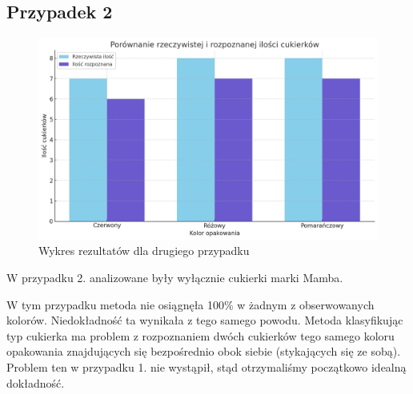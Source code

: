 \documentclass{article}
\begin{document}
\subsection{Przypadek 2}

\begin{figure}[H]
    \centering
    \includegraphics[width=\linewidth]{wykres2.png}
    \caption{Wykres rezultatów dla drugiego przypadku}
    \label{fig:przypadek2}
\end{figure}


W przypadku 2. analizowane były wyłącznie cukierki marki Mamba.


W tym przypadku metoda nie osiągnęła 100\% w żadnym z obserwowanych kolorów. Niedokładność ta wynikała z tego samego powodu. Metoda klasyfikując typ cukierka ma problem z rozpoznaniem dwóch cukierków tego samego koloru opakowania znajdujących się bezpośrednio obok siebie (stykających się ze sobą). Problem ten w przypadku 1. nie wystąpił, stąd otrzymaliśmy początkowo idealną dokładność.
\end{document}
